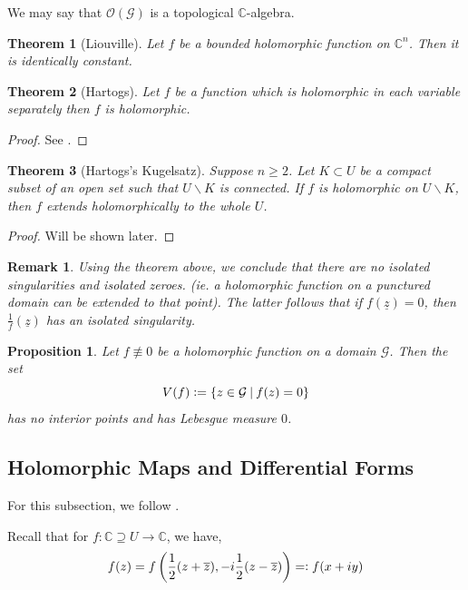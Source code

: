\documentclass{article}
\newtheorem{theorem}{Theorem} [section]
\newtheorem{proposition}{Proposition}[section]
\newtheorem{remark}{Remark}[section]
\newcommand{\defeq}{\vcentcolon=}
\newcommand{\fedeq}{=\vcentcolon}
\newcommand{\C}[0]{\mathbb{C}}
\newcommand{\G}[0]{\mathcal{G}}
\newcommand{\Ouv}[0]{\mathcal{O}}
\begin{document}
We may say that $\Ouv(\G)$ is a topological $\C$-algebra.

\begin{theorem}[Liouville]
Let $f$ be a bounded holomorphic function on $\C^n$. Then it is identically constant.
\end{theorem}

\begin{theorem}[Hartogs]
Let $f$ be a function which is holomorphic in each variable separately then $f$ is holomorphic.
\end{theorem}

\begin{proof}
See \cite{Hom}.
\end{proof}

\begin{theorem}[Hartogs's Kugelsatz]%
Suppose $n\geq2$. Let $K\subset U$ be a compact subset of an open set such that $U\backslash K$ is connected. If $f$ is holomorphic on $U\backslash K$, then $f$ extends holomorphically to the whole $U$. 
\end{theorem}

\begin{proof}
Will be shown later.
\end{proof}

\begin{remark}
  \label{remark_isolated_zeros}
Using the theorem above, we conclude that there are no isolated singularities and isolated zeroes. (ie. a holomorphic function on a punctured domain can be extended to that point). The latter follows that if $f(\underline{z}) = 0$, then ${\frac 1 f}(\underline{z})$ has an isolated singularity.
\end{remark}

\begin{proposition}
Let $f\not\equiv0$ be a holomorphic function on a domain $\mathcal{G}$. Then the set
\begin{equation*}
V(f) \defeq \{z\in\mathcal{G}\:|\: f(z) = 0\}
\end{equation*}
has no interior points and has Lebesgue measure $0$. 
\end{proposition}

\subsection{Holomorphic Maps and Differential Forms}

For this subsection, we follow \cite{Ra}.

Recall that for $f:\C\supseteq U\to \C$, we have,
\begin{equation*}
  f(z) = f\left({\frac 1 2}(z+\overline{z}),-i{\frac 1 2}(z-\overline{z})\right)\fedeq f(x+iy)
\end{equation*}
\end{document}

